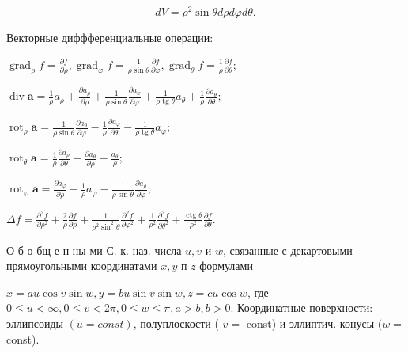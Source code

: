 \documentclass[10pt]{article}
\begin{document}
\[

d V=\rho^{2} \sin \theta d \rho d \varphi d \theta .

\]



Векторные диффференциальные операции:



$\operatorname{grad}_{\rho} f=\frac{\partial f}{\partial \rho}, \operatorname{grad}_{\varphi} f=\frac{1}{\rho \sin \theta} \frac{\partial f}{\partial \varphi}, \operatorname{grad}_{\theta} f=\frac{1}{\rho} \frac{\partial f}{\partial \theta} ;$



$\operatorname{div} \boldsymbol{a}=\frac{1}{\rho} a_{\rho}+\frac{\partial a_{\rho}}{\partial \rho}+\frac{1}{\rho \sin \theta} \frac{\partial a_{\varphi}}{\partial \varphi}+\frac{1}{\rho \operatorname{tg} \theta} a_{\theta}+\frac{1}{\rho} \frac{\partial a_{\theta}}{\partial \theta} ;$



$\operatorname{rot}_{\rho} \boldsymbol{a}=\frac{1}{\rho \sin \theta} \frac{\partial a_{\theta}}{\partial \varphi}-\frac{1}{\rho} \frac{\partial a_{\varphi}}{\partial \theta}-\frac{1}{\rho \operatorname{tg} \theta} a_{\varphi} ;$



$\operatorname{rot}_{\theta} \boldsymbol{a}=\frac{1}{\rho} \frac{\partial a_{\rho}}{\partial \theta}-\frac{\partial a_{\theta}}{\partial \rho}-\frac{a_{\theta}}{\rho} ;$



$\operatorname{rot}_{\varphi} \boldsymbol{a}=\frac{\partial a_{\varphi}}{\partial \rho}+\frac{1}{\rho} a_{\varphi}-\frac{1}{\rho \sin \theta} \frac{\partial a_{\rho}}{\partial \varphi} ;$



$\Delta f=\frac{\partial^{2} f}{\partial \rho^{2}}+\frac{2}{\rho} \frac{\partial f}{\partial \rho}+\frac{1}{\rho^{2} \sin ^{2} \theta} \frac{\partial^{2} f}{\partial \varphi^{2}}+\frac{1}{\rho^{2}} \frac{\partial^{2} f}{\partial \theta^{2}}+\frac{\operatorname{ctg} \theta}{\rho^{2}} \frac{\partial f}{\partial \theta}$.



О б о бщ е н ны ми С. к. наз. числа $u, v$ и $w$, связанные с декартовыми прямоугольными координатами $x, y$ п $z$ формулами



$x=a u \cos v \sin w, y=b u \sin v \sin w, z=c u \cos w$, где $0 \leqslant u<\infty, 0 \leqslant v<2 \pi, 0 \leqslant w \leqslant \pi, a>b, b>0$. Координатные поверхности: эллипсоиды $(u=c o n s t)$, полуплоскости ( $v=$ const) и эллиптич. конусы $(w=$ const).
\end{document}
